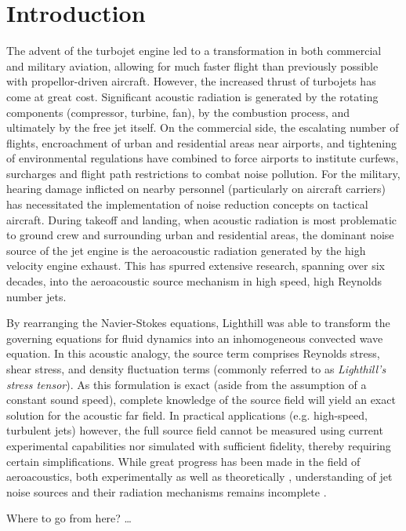 \chapter{Introduction}
\label{introduction}

The advent of the turbojet engine led to a transformation in both commercial and military aviation, allowing for much faster flight than previously possible with propellor-driven aircraft. 
However, the increased thrust of turbojets has come at great cost.
Significant acoustic radiation is generated by the rotating components (compressor, turbine, fan), by the combustion process, and ultimately by the free jet itself. 
On the commercial side, the escalating number of flights, encroachment of urban and residential areas near airports, and tightening of environmental regulations have combined to force airports to institute curfews, surcharges and flight path restrictions to combat noise pollution. 
For the military, hearing damage inflicted on nearby personnel (particularly on aircraft carriers) has necessitated the implementation of noise reduction concepts on tactical aircraft.
During takeoff and landing, when acoustic radiation is most problematic to ground crew and  surrounding urban and residential areas, the dominant noise source of the jet engine is the aeroacoustic radiation generated by the high velocity engine exhaust.
This has spurred extensive research, spanning over six decades, into the aeroacoustic source mechanism in high speed, high Reynolds number jets. 

By rearranging the Navier-Stokes equations, Lighthill \citep{Lighthill1952} was able to transform the governing equations for fluid dynamics into an inhomogeneous convected wave equation. 
In this acoustic analogy, the source term comprises Reynolds stress, shear stress, and density fluctuation terms (commonly referred to as \emph{Lighthill's stress tensor}).
As this formulation is exact (aside from the assumption of a constant sound speed), complete knowledge of the source field will yield an exact solution for the acoustic far field.
In practical applications (e.g. high-speed, turbulent jets) however, the full source field cannot be measured using current experimental capabilities nor simulated with sufficient fidelity, thereby requiring certain simplifications.
While great progress has been made in the field of aeroacoustics, both experimentally \citep{Tam1996, Viswanathan2006, Tam2008} as well as theoretically \citep{Cabana2008}, understanding of jet noise sources and their radiation mechanisms remains incomplete \citep{Jordan2008}.

Where to go from here? \ldots